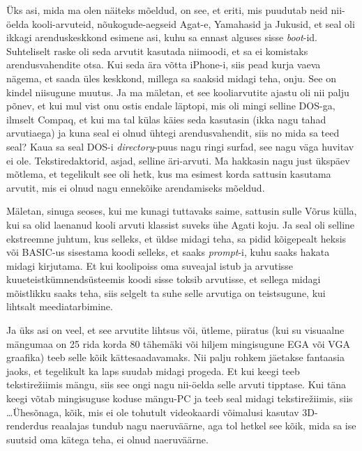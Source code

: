 Üks asi, mida ma olen näiteks mõeldud, on see, et eriti, mis puudutab neid nii-öelda kooli-arvuteid, nõukogude-aegseid Agat-e, Yamahasid ja Jukusid, et seal oli ikkagi arenduskeskkond esimene asi, kuhu sa ennast alguses sisse \emph{boot}-id. Suhteliselt  raske oli seda arvutit kasutada niimoodi, et sa ei komistaks  arendusvahendite otsa. Kui seda ära võtta iPhone-i, siis pead kurja vaeva nägema, et saada üles keskkond, millega sa saaksid midagi teha, onju. See on kindel niisugune muutus. Ja ma mäletan, et see kooliarvutite ajastu oli nii palju põnev, et kui mul vist onu ostis endale läptopi, mis oli mingi selline DOS-ga, ilmselt Compaq, et kui ma tal külas käies seda kasutasin (ikka nagu tahad arvutiaega) ja kuna seal ei olnud ühtegi arendusvahendit, siis no mida sa teed seal? Kaua sa seal DOS-i \emph{directory}-puus nagu ringi surfad, see nagu  väga huvitav ei ole. Tekstiredaktorid, asjad, selline äri-arvuti. Ma hakkasin nagu just ükspäev mõtlema, et tegelikult see oli hetk, kus ma esimest korda sattusin kasutama arvutit, mis ei olnud nagu ennekõike arendamiseks mõeldud. 

Mäletan, sinuga seoses, kui me kunagi tuttavaks saime, sattusin sulle Võrus külla, kui sa olid laenanud kooli arvuti klassist suveks ühe Agati koju. Ja seal oli selline ekstreemne juhtum, kus selleks, et üldse midagi teha, sa pidid kõigepealt heksis või BASIC-us sisestama koodi selleks, et saaks \emph{prompt}-i, kuhu saaks hakata midagi kirjutama. Et kui koolipoiss oma suveajal istub ja arvutisse kuueteistkümnendsüsteemis koodi sisse toksib arvutisse,  et sellega  midagi mõistlikku saaks teha, siis selgelt ta suhe selle arvutiga on teistsugune, kui lihtsalt meediatarbimine. 

Ja üks asi on veel, et see arvutite lihtsus või, ütleme, piiratus (kui su visuaalne mängumaa on 25 rida korda 80 tähemäki või hiljem mingisugune EGA või VGA graafika) teeb selle kõik kättesaadavamaks. Nii palju rohkem jäetakse fantaasia jaoks, et tegelikult ka laps suudab  midagi progeda. Et kui keegi teeb tekstirežiimis mängu, siis see ongi nagu nii-öelda selle arvuti tipptase. Kui täna keegi võtab mingisuguse koduse mängu-PC ja teeb seal midagi tekstirežiimis, siis \dots Ühesõnaga, kõik, mis ei ole tohutult videokaardi võimalusi kasutav 3D-renderdus  reaalajas tundub nagu naeruväärne, aga tol hetkel see kõik, mida sa ise suutsid oma kätega teha, ei olnud naeruväärne. 


